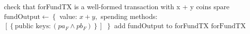 \begin{algorithm}
  \caption{$\textsc{Funding}\left(Alice, Bob, x, y, pa_F, pb_F,
  \mathrm{forFundTX}\right)$}
  \label{alg:payfunc}
  \begin{algorithmic}[1]
    \State check that forFundTX is a well-formed transaction with x + y coins
    spare
    \State $\mathrm{fundOutput} \gets \left\{\right.$
    \Indent
      \State value: $x + y,$
      \State spending methods: $\left[\left\{ \text{public keys}: \left(pa_F
      \wedge pb_F\right)\right\}\right]$
    \EndIndent
    \State $\left.\right\}$
    \State add fundOutput to forFundTX
    \State \Return $\mathrm{forFundTX}$
  \end{algorithmic}
\end{algorithm}
